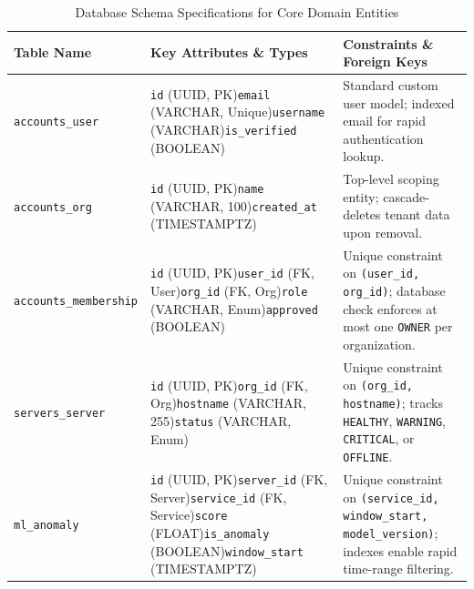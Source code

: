 \begin{table}[H]
\centering
\small
\caption{Database Schema Specifications for Core Domain Entities}\label{tab:schema}
\begin{tabularx}{\textwidth}{p{} p{} X}
\toprule
\textbf{Table Name} & \textbf{Key Attributes \& Types} & \textbf{Constraints \& Foreign Keys}\\
\midrule
\texttt{accounts\_user} & \texttt{id} (UUID, PK)\newline \texttt{email} (VARCHAR, Unique)\newline \texttt{username} (VARCHAR)\newline \texttt{is\_verified} (BOOLEAN) & Standard custom user model; indexed email for rapid authentication lookup.\\
\addlinespace[3pt]
\texttt{accounts\_org} & \texttt{id} (UUID, PK)\newline \texttt{name} (VARCHAR, 100)\newline \texttt{created\_at} (TIMESTAMPTZ) & Top-level scoping entity; cascade-deletes tenant data upon removal.\\
\addlinespace[3pt]
\texttt{accounts\_membership} & \texttt{id} (UUID, PK)\newline \texttt{user\_id} (FK, User)\newline \texttt{org\_id} (FK, Org)\newline \texttt{role} (VARCHAR, Enum)\newline \texttt{approved} (BOOLEAN) & Unique constraint on \texttt{(user\_id, org\_id)}; database check enforces at most one \texttt{OWNER} per organization.\\
\addlinespace[3pt]
\texttt{servers\_server} & \texttt{id} (UUID, PK)\newline \texttt{org\_id} (FK, Org)\newline \texttt{hostname} (VARCHAR, 255)\newline \texttt{status} (VARCHAR, Enum) & Unique constraint on \texttt{(org\_id, hostname)}; tracks \texttt{HEALTHY}, \texttt{WARNING}, \texttt{CRITICAL}, or \texttt{OFFLINE}.\\
\addlinespace[3pt]
\texttt{ml\_anomaly} & \texttt{id} (UUID, PK)\newline \texttt{server\_id} (FK, Server)\newline \texttt{service\_id} (FK, Service)\newline \texttt{score} (FLOAT)\newline \texttt{is\_anomaly} (BOOLEAN)\newline \texttt{window\_start} (TIMESTAMPTZ) & Unique constraint on \texttt{(service\_id, window\_start, model\_version)}; indexes enable rapid time-range filtering.\\

\end{tabularx}
\end{table}
